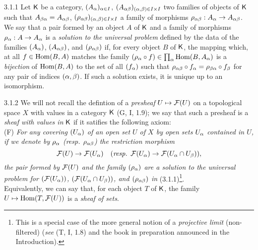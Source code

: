\documentclass[../main.tex]{subfiles}
\begin{document}
\begin{env}{3.1.1}
Let $\mathsf{K}$ be a category, $(A_\alpha)_{\alpha\in I}$,
$(A_{\alpha\beta})_{(\alpha,\beta)\in I\times I}$ two families of objects
of $\mathsf{K}$ such that $A_{\beta\alpha}=A_{\alpha\beta}$,
$(\rho_{\alpha\beta})_{(\alpha,\beta)\in I\times I}$ a family of morphisms
$\rho_{\alpha\beta}:A_\alpha\to A_{\alpha\beta}$. We say that a pair formed by
an object $A$ of $\mathsf{K}$ and a family of morphisms $\rho_\alpha:A\to A_\alpha$ 
is a \emph{solution to the universal problem} defined by the data of the families
$(A_\alpha)$, $(A_{\alpha\beta})$, and $(\rho_{\alpha\beta})$ if, for every object $B$
of $\mathsf{K}$, the mapping which, at all $f\in\operatorname{Hom}(B,A)$ matches the
family $(\rho_\alpha\circ f)\in\prod_\alpha\operatorname{Hom}(B,A_\alpha)$ is a \emph{bijection}
of $\operatorname{Hom}(B,A)$ to the set of all $(f_\alpha)$ such that
$\rho_{\alpha\beta}\circ f_\alpha=\rho_{\beta\alpha}\circ f_\beta$ for any pair of
indices $(\alpha,\beta)$. If such a solution exists, it is unique up to an isomorphism.
\end{env}

\begin{env}{3.1.2}
We will not recall the defintion of a \emph{presheaf} $U\mapsto\mathcal{F}(U)$ on a
topological space $X$ with values in a category $\mathsf{K}$ (G, I, 1.9); we say that
such a presheaf is a \emph{sheaf with values in} $\mathsf{K}$ if it satifies the following
axiom:\\

(F) \emph{For any covering $(U_\alpha)$ of an open set $U$ of $X$ by open sets
   $U_\alpha$ contained in $U$, if we denote by $\rho_\alpha$ (resp. $\rho_{\alpha\beta}$) the
   restriction morphism}
   \[
     \mathcal{F}(U)\to\mathcal{F}(U_\alpha)\quad(\text{\emph{resp. }}\mathcal{F}(U_\alpha)\to\mathcal{F}(U_\alpha\cap U_\beta)),
   \]
   \emph{the pair formed by $\mathcal{F}(U)$ and the family $(\rho_\alpha)$ are a solution to
   the universal problem for $(\mathcal{F}(U_\alpha))$, $(\mathcal{F}(U_\alpha\cap U_\beta))$, and $(\rho_{\alpha\beta})$
   in} (3.1.1)\footnote{This is a special case of the more general notion of a
   \emph{projective limit} (non-filtered) (\emph{see} (T, I, 1.8) and the book in
   preparation announced in the Introduction).}.\\

Equivalently, we can say that, for each object $T$ of $\mathsf{K}$, the family
$U\mapsto\operatorname{Hom}(T,\mathcal{F}(U))$ is a \emph{sheaf of sets}.
\end{env}
\end{document}
